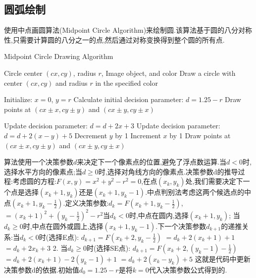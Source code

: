 \documentclass[a4paper,twoside]{article}
\begin{document}
\subsection{圆弧绘制}
使用中点画圆算法(Midpoint Circle Algorithm)来绘制圆.该算法基于圆的八分对称性,只需要计算圆的八分之一的点,然后通过对称变换得到整个圆的所有点.
\begin{algorithm}[H]
    \caption{Midpoint Circle Drawing Algorithm}
    \label{alg:midpoint_circle}
    \begin{algorithmic}[1]
        \REQUIRE Circle center $(cx, cy)$, radius $r$, Image object, and color
        \ENSURE Draw a circle with center $(cx, cy)$ and radius $r$ in the specified color

        \STATE Initialize: $x = 0$, $y = r$
        \STATE Calculate initial decision parameter: $d = 1.25 - r$
        \STATE Draw points at $(cx \pm x, cy \pm y)$ and $(cx \pm y, cy \pm x)$
        
                \STATE Update decision parameter: $d = d + 2x + 3$
            \ELSE
                \STATE Update decision parameter: $d = d + 2(x - y) + 5$
                \STATE Decrement $y$ by 1
            \ENDIF
            \STATE Increment $x$ by 1
            \STATE Draw points at $(cx \pm x, cy \pm y)$ and $(cx \pm y, cy \pm x)$
        \ENDWHILE
    \end{algorithmic}
\end{algorithm}
算法使用一个决策参数$d$来决定下一个像素点的位置,避免了浮点数运算.当$d < 0$时,选择水平方向的像素点;当$d \geq 0$时,选择对角线方向的像素点.决策参数d的推导过程:考虑圆的方程:$F(x,y) = x^2 + y^2 - r^2 = 0$,在点$(x_k, y_k)$处,我们需要决定下一个点是选择$(x_k+1, y_k)$还是$(x_k+1, y_k-1)$.中点判别法考虑这两个候选点的中点$(x_k+1, y_k-\frac{1}{2})$.定义决策参数:$d_k = F(x_k+1, y_k-\frac{1}{2})$,$= (x_k+1)^2 + (y_k-\frac{1}{2})^2 - r^2$当$d_k < 0$时,中点在圆内,选择$(x_k+1, y_k)$;
当$d_k \geq 0$时,中点在圆外或圆上,选择$(x_k+1, y_k-1)$.下一个决策参数$d_{k+1}$的递推关系:当$d_k < 0$时(选择E点):
   $d_{k+1} = F(x_k+2, y_k-\frac{1}{2})$
   $= d_k + 2(x_k+1) + 1$
   $= d_k + 2x_k + 3$
2. 当$d_k \geq 0$时(选择SE点):
   $d_{k+1} = F(x_k+2, (y_k-1)-\frac{1}{2})$
   $= d_k + 2(x_k+1) - 2(y_k-1) + 1$
   $= d_k + 2(x_k - y_k) + 5$
这就是代码中更新决策参数d的依据.初始值$d_0 = 1.25 - r$是将$k=0$代入决策参数公式得到的.
\end{document}
